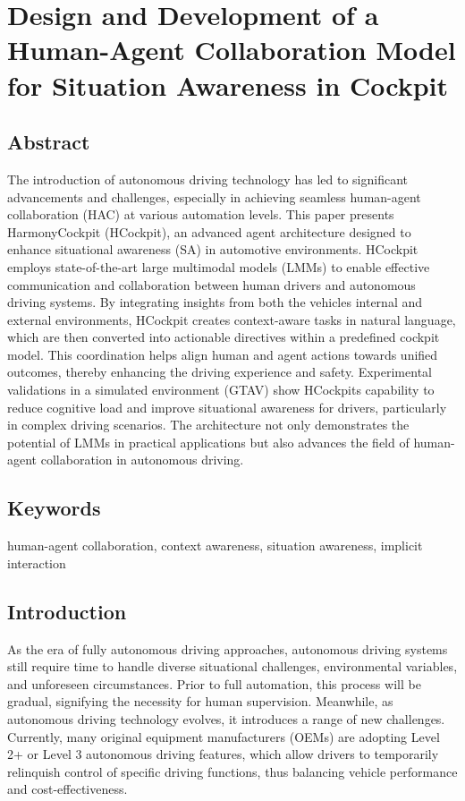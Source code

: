 \documentclass[
]{article}
\author{}
\date{}
\begin{document}
\section{Design and Development of a Human-Agent Collaboration Model for
Situation Awareness in
Cockpit}\label{design-and-development-of-a-human-agent-collaboration-model-for-situation-awareness-in-cockpit}

\subsection{Abstract}\label{abstract}

The introduction of autonomous driving technology has led to significant
advancements and challenges, especially in achieving seamless
human-agent collaboration (HAC) at various automation levels. This paper
presents HarmonyCockpit (HCockpit), an advanced agent architecture
designed to enhance situational awareness (SA) in automotive
environments. HCockpit employs state-of-the-art large multimodal models
(LMMs) to enable effective communication and collaboration between human
drivers and autonomous driving systems. By integrating insights from
both the vehicle\textquotesingle s internal and external environments,
HCockpit creates context-aware tasks in natural language, which are then
converted into actionable directives within a predefined cockpit model.
This coordination helps align human and agent actions towards unified
outcomes, thereby enhancing the driving experience and safety.
Experimental validations in a simulated environment (GTAV) show
HCockpit\textquotesingle s capability to reduce cognitive load and
improve situational awareness for drivers, particularly in complex
driving scenarios. The architecture not only demonstrates the potential
of LMMs in practical applications but also advances the field of
human-agent collaboration in autonomous driving.

\subsection{Keywords}\label{keywords}

human-agent collaboration, context awareness, situation awareness,
implicit interaction

\subsection{Introduction}\label{introduction}

As the era of fully autonomous driving approaches, autonomous driving
systems still require time to handle diverse situational challenges,
environmental variables, and unforeseen circumstances. Prior to full
automation, this process will be gradual, signifying the necessity for
human supervision. Meanwhile, as autonomous driving technology evolves,
it introduces a range of new challenges. Currently, many original
equipment manufacturers (OEMs) are adopting Level 2+ or Level 3
autonomous driving features, which allow drivers to temporarily
relinquish control of specific driving functions, thus balancing vehicle
performance and cost-effectiveness.
\end{document}
